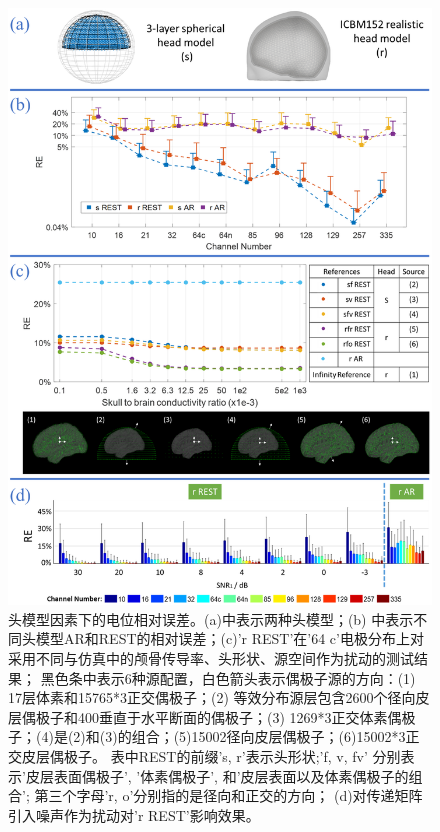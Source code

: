 \begin{figure}[h!]
	\centering
	\includegraphics[width=13cm]{pic/JNE/figure9.png}
	\caption{头模型因素下的电位相对误差。(a)中表示两种头模型；(b) 中表示不同头模型AR和REST的相对误差；(c)'r REST'在'64 c'电极分布上对采用不同与仿真中的颅骨传导率、头形状、源空间作为扰动的测试结果； 黑色条中表示6种源配置，白色箭头表示偶极子源的方向：(1) 17层体素和15765*3正交偶极子；(2) 等效分布源层包含2600个径向皮层偶极子和400垂直于水平断面的偶极子；(3) 1269*3正交体素偶极子；(4)是(2)和(3)的组合；(5)15002径向皮层偶极子；(6)15002*3正交皮层偶极子。 表中REST的前缀's, r'表示头形状;'f, v, fv' 分别表示'皮层表面偶极子', '体素偶极子', 和'皮层表面以及体素偶极子的组合'; 第三个字母'r, o'分别指的是径向和正交的方向； (d)对传递矩阵引入噪声作为扰动对'r REST'影响效果。}
	\label{2.9}
\end{figure}
